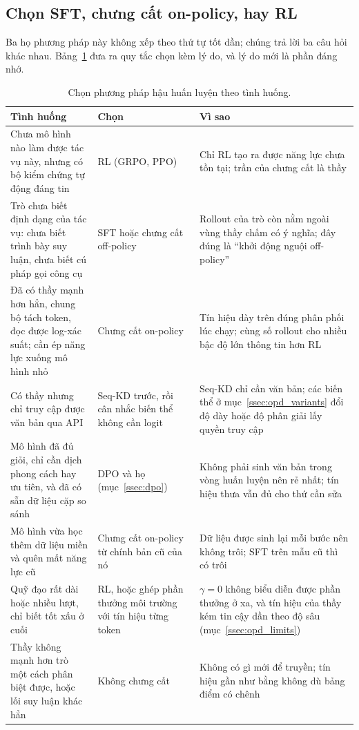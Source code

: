 \subsection{Chọn SFT, chưng cất on-policy, hay RL}
\label{ssec:opd_decision}

Ba họ phương pháp này không xếp theo thứ tự tốt dần; chúng trả lời ba câu hỏi khác nhau. Bảng~\ref{tab:opd_decision} đưa ra quy tắc chọn kèm lý do, và lý do mới là phần đáng nhớ.

\begin{table}[H]
\centering\small
\caption{Chọn phương pháp hậu huấn luyện theo tình huống.}
\label{tab:opd_decision}
\begin{tabularx}{\textwidth}{@{}>{\raggedright\arraybackslash}p{4.6cm}>{\raggedright\arraybackslash}p{2.7cm}X@{}}
\toprule
\textbf{Tình huống} & \textbf{Chọn} & \textbf{Vì sao} \\
\midrule
Chưa mô hình nào làm được tác vụ này, nhưng có bộ kiểm chứng tự động đáng tin & RL (GRPO, PPO) & Chỉ RL tạo ra được năng lực chưa tồn tại; trần của chưng cất là thầy \\
\addlinespace
Trò chưa biết định dạng của tác vụ: chưa biết trình bày suy luận, chưa biết cú pháp gọi công cụ & SFT hoặc chưng cất off-policy & Rollout của trò còn nằm ngoài vùng thầy chấm có ý nghĩa; đây đúng là ``khởi động nguội off-policy'' \\
\addlinespace
Đã có thầy mạnh hơn hẳn, chung bộ tách token, đọc được log-xác suất; cần ép năng lực xuống mô hình nhỏ & Chưng cất on-policy & Tín hiệu dày trên đúng phân phối lúc chạy; cùng số rollout cho nhiều bậc độ lớn thông tin hơn RL \\
\addlinespace
Có thầy nhưng chỉ truy cập được văn bản qua API & Seq-KD trước, rồi cân nhắc biến thể không cần logit & Seq-KD chỉ cần văn bản; các biến thể ở mục~\ref{ssec:opd_variants} đổi độ dày hoặc độ phân giải lấy quyền truy cập \\
\addlinespace
Mô hình đã đủ giỏi, chỉ cần dịch phong cách hay ưu tiên, và đã có sẵn dữ liệu cặp so sánh & DPO và họ (mục~\ref{ssec:dpo}) & Không phải sinh văn bản trong vòng huấn luyện nên rẻ nhất; tín hiệu thưa vẫn đủ cho thứ cần sửa \\
\addlinespace
Mô hình vừa học thêm dữ liệu miền và quên mất năng lực cũ & Chưng cất on-policy từ chính bản cũ của nó & Dữ liệu được sinh lại mỗi bước nên không trôi; SFT trên mẫu cũ thì có trôi \\
\addlinespace
Quỹ đạo rất dài hoặc nhiều lượt, chỉ biết tốt xấu ở cuối & RL, hoặc ghép phần thưởng môi trường với tín hiệu từng token & $\gamma=0$ không biểu diễn được phần thưởng ở xa, và tín hiệu của thầy kém tin cậy dần theo độ sâu (mục~\ref{ssec:opd_limits}) \\
\addlinespace
Thầy không mạnh hơn trò một cách phân biệt được, hoặc lối suy luận khác hẳn & Không chưng cất & Không có gì mới để truyền; tín hiệu gần như bằng không dù bảng điểm có chênh \\
\bottomrule
\end{tabularx}
\end{table}


